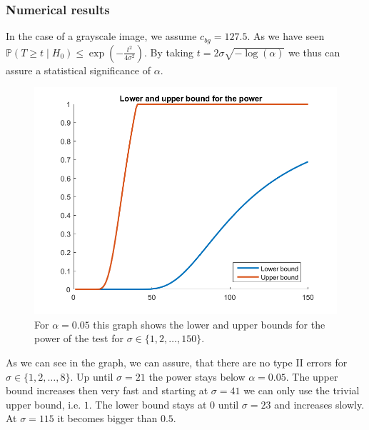 \documentclass{beamer}
\begin{document}
\begin{frame}
	\subsubsection{Numerical results}
	
	In the case of a grayscale image, we assume $c_{bg} = 127.5$. As we have seen $\mathbb{P}(T \geq t \mid H_0) \leq \exp \left( - \frac{t^2}{4 \sigma^2} \right)$. By taking $t = 2 \sigma \sqrt{- \log(\alpha)}$ we thus can assure a statistical significance of $\alpha$.
	
	\begin{figure}[h]
		\includegraphics[width=0.6\linewidth]{Power_Bounds}
		\caption[Power bounds]{For $\alpha = 0.05$ this graph shows the lower and upper bounds for the power of the test for $\sigma \in \{ 1, 2, \dots, 150 \}$.}
		\label{fig:demo1comparison}
	\end{figure}
\end{frame}

\begin{frame}
	As we can see in the graph, we can assure, that there are no type II errors for $\sigma \in \{ 1, 2, \dots, 8 \}$. Up until $\sigma = 21$ the power stays below $\alpha = 0.05$. The upper bound increases then very fast and starting at $\sigma = 41$ we can only use the trivial upper bound, i.e. $1$. The lower bound stays at $0$ until $\sigma = 23$ and increases slowly. At $\sigma = 115$ it becomes bigger than $0.5$.
\end{frame}
\end{document}
